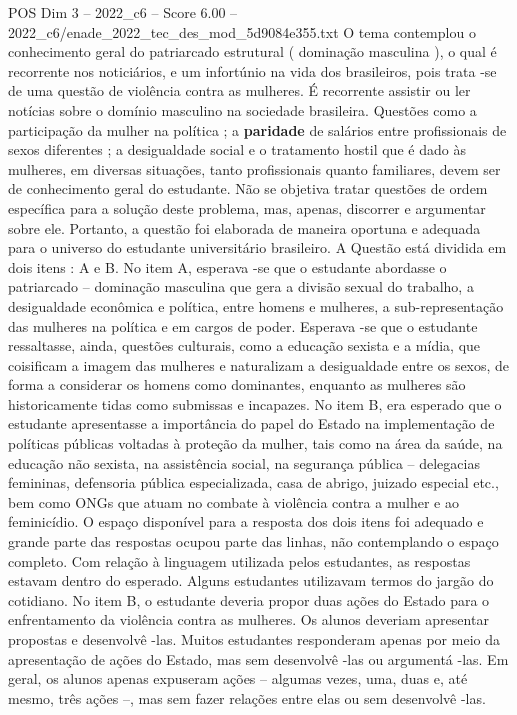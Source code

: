 \begin{textsample}{POS Dim 3 – 2022\_c6 – Score 6.00 – 2022\_c6/enade\_2022\_tec\_des\_mod\_5d9084e355.txt}
O tema contemplou o conhecimento geral do patriarcado estrutural ( dominação masculina ), o qual é recorrente nos noticiários, e um infortúnio na vida dos brasileiros, pois trata -se de uma questão de violência contra as mulheres.
É recorrente assistir ou ler notícias sobre o domínio masculino na sociedade brasileira.
Questões como a participação da mulher na política ; a \textbf{paridade} de salários entre profissionais de sexos diferentes ; a desigualdade social e o tratamento hostil que é dado às mulheres, em diversas situações, tanto profissionais quanto familiares, devem ser de conhecimento geral do estudante.
Não se objetiva tratar questões de ordem específica para a solução deste problema, mas, apenas, discorrer e argumentar sobre ele.
Portanto, a questão foi elaborada de maneira oportuna e adequada para o universo do estudante universitário brasileiro.
A Questão está dividida em dois itens : A e B.
No item A, esperava -se que o estudante abordasse o patriarcado – dominação masculina que gera a divisão sexual do trabalho, a desigualdade econômica e política, entre homens e mulheres, a sub-representação das mulheres na política e em cargos de poder.
Esperava -se que o estudante ressaltasse, ainda, questões culturais, como a educação sexista e a mídia, que coisificam a imagem das mulheres e naturalizam a desigualdade entre os sexos, de forma a considerar os homens como dominantes, enquanto as mulheres são historicamente tidas como submissas e incapazes.
No item B, era esperado que o estudante apresentasse a importância do papel do Estado na implementação de políticas públicas voltadas à proteção da mulher, tais como na área da saúde, na educação não sexista, na assistência social, na segurança pública – delegacias femininas, defensoria pública especializada, casa de abrigo, juizado especial etc., bem como ONGs que atuam no combate à violência contra a mulher e ao feminicídio.
O espaço disponível para a resposta dos dois itens foi adequado e grande parte das respostas ocupou parte das linhas, não contemplando o espaço completo.
Com relação à linguagem utilizada pelos estudantes, as respostas estavam dentro do esperado.
Alguns estudantes utilizavam termos do jargão do cotidiano.
No item B, o estudante deveria propor duas ações do Estado para o enfrentamento da violência contra as mulheres.
Os alunos deveriam apresentar propostas e desenvolvê -las.
Muitos estudantes responderam apenas por meio da apresentação de ações do Estado, mas sem desenvolvê -las ou argumentá -las.
Em geral, os alunos apenas expuseram ações – algumas vezes, uma, duas e, até mesmo, três ações –, mas sem fazer relações entre elas ou sem desenvolvê -las.

\end{textsample}

